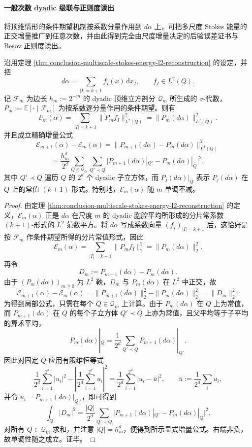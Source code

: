 \paragraph{一般次数 dyadic 级联与正则度读出}
将顶维情形的条件期望机制按系数分量作用到 \(d\alpha\) 上，可把多尺度 Stokes 能量的正交增量推广到任意次数，并由此得到完全由尺度增量决定的后验误差证书与 Besov 正则度读出。

\begin{theorem}\label{thm:conclusion-stokes-energy-general-degree-cascade}
沿用定理 \ref{thm:conclusion-multiscale-stokes-energy-l2-reconstruction} 的设定，并把
\[
d\alpha=\sum_{|I|=k+1} f_I(x)\,\mathrm d x_I,
\qquad
f_I\in L^2(Q).
\]
记 \(\mathscr F_m\) 为边长 \(h_m:=2^{-m}\) 的 dyadic 顶维立方剖分 \(\mathcal Q_m\) 所生成的 \(\sigma\)-代数，\(P_m:=\mathbb E[\cdot\mid \mathscr F_m]\) 为按系数逐分量作用的条件期望。则有
\[
\mathcal E_m(\alpha)
=
\sum_{|I|=k+1}\|P_m f_I\|_{L^2(Q)}^2
=
\|P_m(d\alpha)\|_{L^2(Q)}^2.
\]
并且成立精确增量公式
\[
\mathcal E_{m+1}(\alpha)-\mathcal E_m(\alpha)
=
\|P_{m+1}(d\alpha)-P_m(d\alpha)\|_{L^2(Q)}^2
\]
\[
=
\frac{h_m^d}{2^d}\sum_{Q\in\mathcal Q_m}\sum_{Q'\prec Q}
\bigl|
P_{m+1}(d\alpha)|_{Q'}-P_m(d\alpha)|_{Q}
\bigr|^2,
\]
其中 \(Q'\prec Q\) 遍历 \(Q\) 的 \(2^d\) 个 dyadic 子立方体，而 \(P_j(d\alpha)|_Q\) 表示 \(P_j(d\alpha)\) 在 \(Q\) 上的常值 \((k+1)\)-形式。特别地，\(\mathcal E_m(\alpha)\) 随 \(m\) 单调不减。
\end{theorem}
\begin{proof}
由定理 \ref{thm:conclusion-multiscale-stokes-energy-l2-reconstruction} 的定义，\(\mathcal E_m(\alpha)\) 正是 \(d\alpha\) 在尺度 \(m\) 的 dyadic 胞腔平均所形成的分片常系数 \((k+1)\)-形式的 \(L^2\) 范数平方。将 \(d\alpha\) 写成系数向量 \((f_I)_{|I|=k+1}\) 后，这恰好是按 \(\mathscr F_m\) 作条件期望所得的分片常值形式，因此
\[
\mathcal E_m(\alpha)
=
\sum_{|I|=k+1}\|P_m f_I\|_2^2
=
\|P_m(d\alpha)\|_2^2.
\]
再令
\[
D_m:=P_{m+1}(d\alpha)-P_m(d\alpha).
\]
由于 \((P_m(d\alpha))_{m\ge 0}\) 为 \(L^2\) 鞅，\(D_m\) 与 \(P_m(d\alpha)\) 在 \(L^2\) 中正交，故
\[
\mathcal E_{m+1}(\alpha)-\mathcal E_m(\alpha)
=
\|P_{m+1}(d\alpha)\|_2^2-\|P_m(d\alpha)\|_2^2
=
\|D_m\|_2^2.
\]
为得到局部公式，只需在每个 \(Q\in\mathcal Q_m\) 上计算。由于 \(P_m(d\alpha)\) 在 \(Q\) 上为常值，而 \(P_{m+1}(d\alpha)\) 在 \(Q\) 的每个子立方体 \(Q'\prec Q\) 上亦为常值，且父平均等于子平均的算术平均，
\[
P_m(d\alpha)|_Q
=
\frac1{2^d}\sum_{Q'\prec Q}P_{m+1}(d\alpha)|_{Q'}.
\]
因此对固定 \(Q\) 应用有限维恒等式
\[
\frac1{2^d}\sum_{i=1}^{2^d}|u_i|^2
-\left|\frac1{2^d}\sum_{i=1}^{2^d}u_i\right|^2
=
\frac1{2^d}\sum_{i=1}^{2^d}|u_i-\bar u|^2,
\qquad
\bar u:=\frac1{2^d}\sum_i u_i,
\]
并令 \(u_i=P_{m+1}(d\alpha)|_{Q_i'}\)，即可得到
\[
\int_Q |D_m|^2
=
\frac{|Q|}{2^d}\sum_{Q'\prec Q}
\bigl|
P_{m+1}(d\alpha)|_{Q'}-P_m(d\alpha)|_Q
\bigr|^2.
\]
对所有 \(Q\in\mathcal Q_m\) 求和，并注意 \(|Q|=h_m^d\)，便得到所示显式增量公式。右端非负，故单调性随之成立。证毕。
\end{proof}


